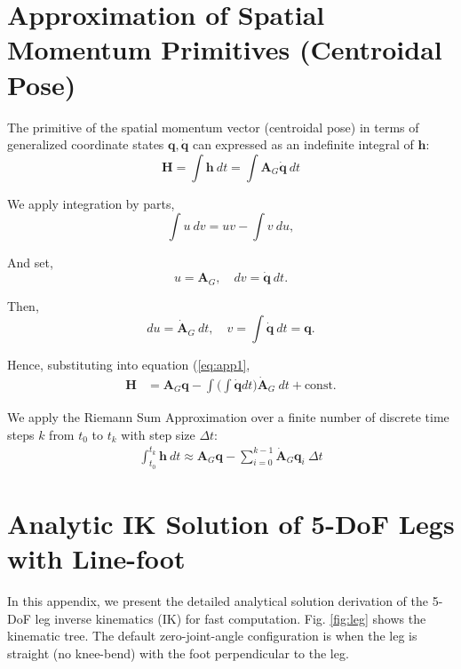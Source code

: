 \appendices
\section{Approximation of Spatial Momentum Primitives (Centroidal Pose)}
\label{sec:appendix}


The primitive of the spatial momentum vector (centroidal pose) in terms of generalized coordinate states $\mathbf q, \dot{\mathbf q}$ can expressed as an indefinite integral of $\bm h$:
\begin{equation}
\label{eq:app1}
    \bm H = \int \bm h\:dt= \int \bm A_G\dot{\mathbf q}\: dt 
\end{equation}

We apply integration by parts, 
\begin{equation}
    \int u\:dv = uv - \int v\: du,
\end{equation}

And set,
\begin{equation}
    u = \bm A_G,\quad dv = \dot{\mathbf q}\: dt.
\end{equation}

Then,
\begin{equation}
    du = \dot{\bm A}_G\:dt,\quad v = \int \dot{\mathbf q}\: dt = \mathbf q.
\end{equation}

Hence, substituting into equation (\ref{eq:app1},
\begin{equation}
\begin{aligned}
        \bm H &
        =\bm A_G\mathbf q - \int \biggl( \int \dot{\mathbf q} dt \biggl)\dot{\bm A}_G\:dt + \text{const.}
\end{aligned}
\end{equation}

We apply the Riemann Sum Approximation over a finite number of discrete time steps $k$ from $t_0$ to $t_k$ with step size $\Delta t$:
\begin{equation}
\begin{aligned}
        \int^{t_k}_{t_0}\bm h\: dt \approx
        \bm A_G\mathbf q - \sum^{k-1}_{i = 0} \dot{\bm A}_G\mathbf q_i\:\Delta t
\end{aligned}
\end{equation}
\vspace{0.5cm}




\section{Analytic IK Solution of 5-DoF Legs with Line-foot}
In this appendix, we present the detailed analytical solution derivation of the 5-DoF leg inverse kinematics (IK) for fast computation. Fig. \ref{fig:leg} shows the kinematic tree. The default zero-joint-angle configuration is when the leg is straight (no knee-bend) with the foot perpendicular to the leg.


